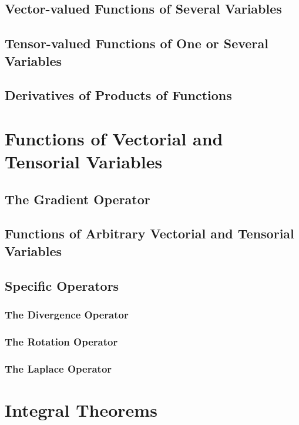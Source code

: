 \documentclass[a5paper,twosided,11pt,DIV=15,BCOR=0mm]{scrbook}
\begin{document}
\subsection{Vector-valued Functions of Several Variables}

\subsection{Tensor-valued Functions of One or Several Variables}

\subsection{Derivatives of Products of Functions}

\section{Functions of Vectorial and Tensorial Variables}

\subsection{The Gradient Operator}

\subsection{Functions of Arbitrary Vectorial and Tensorial Variables}

\subsection{Specific Operators}

\subsubsection{The Divergence Operator}

\subsubsection{The Rotation Operator}

\subsubsection{The Laplace Operator}

\section{Integral Theorems}
\end{document}
